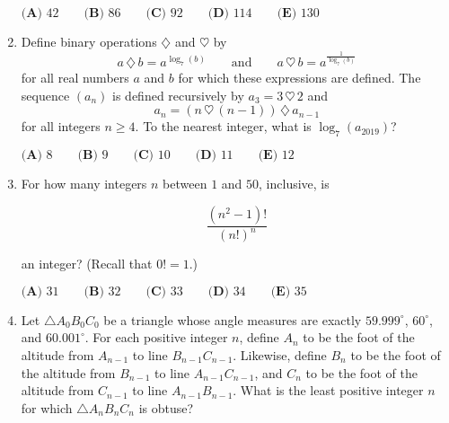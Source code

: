 \documentclass{article}
\begin{document}
\begin{enumerate}[label=\arabic*., itemsep=0.5em]
\(\textbf{(A) } 42 \qquad \textbf{(B) }86 \qquad \textbf{(C) } 92 \qquad \textbf{(D) } 114 \qquad \textbf{(E) } 130\)\par \vspace{0.5em}\item Define binary operations \(\diamondsuit\) and \(\heartsuit\) by 
\begin{equation*}
a \, \diamondsuit \, b = a^{\log_{7}(b)} \qquad \text{and} \qquad a  \, \heartsuit \, b = a^{\frac{1}{\log_{7}(b)}}
\end{equation*}
for all real numbers \(a\) and \(b\) for which these expressions are defined. The sequence \((a_n)\) is defined recursively by \(a_3 = 3\, \heartsuit\, 2\) and 
\begin{equation*}
a_n = (n\, \heartsuit\, (n-1)) \,\diamondsuit\, a_{n-1}
\end{equation*}
for all integers \(n \geq 4\). To the nearest integer, what is \(\log_{7}(a_{2019})\)?

\(\textbf{(A) } 8 \qquad  \textbf{(B) } 9 \qquad \textbf{(C) } 10 \qquad \textbf{(D) } 11 \qquad \textbf{(E) } 12\)\par \vspace{0.5em}\item For how many integers \(n\) between \(1\) and \(50\), inclusive, is

\begin{equation*}
\frac{(n^2-1)!}{(n!)^n}
\end{equation*}

an integer? (Recall that \(0! = 1\).)

\(\textbf{(A) } 31 \qquad \textbf{(B) } 32 \qquad \textbf{(C) } 33 \qquad \textbf{(D) } 34 \qquad \textbf{(E) } 35\)\par \vspace{0.5em}\item Let \(\triangle A_0B_0C_0\) be a triangle whose angle measures are exactly \(59.999^\circ\), \(60^\circ\), and \(60.001^\circ\). For each positive integer \(n\), define \(A_n\) to be the foot of the altitude from \(A_{n-1}\) to line \(B_{n-1}C_{n-1}\). Likewise, define \(B_n\) to be the foot of the altitude from \(B_{n-1}\) to line \(A_{n-1}C_{n-1}\), and \(C_n\) to be the foot of the altitude from \(C_{n-1}\) to line \(A_{n-1}B_{n-1}\). What is the least positive integer \(n\) for which \(\triangle A_nB_nC_n\) is obtuse?


\end{enumerate}
\end{document}
